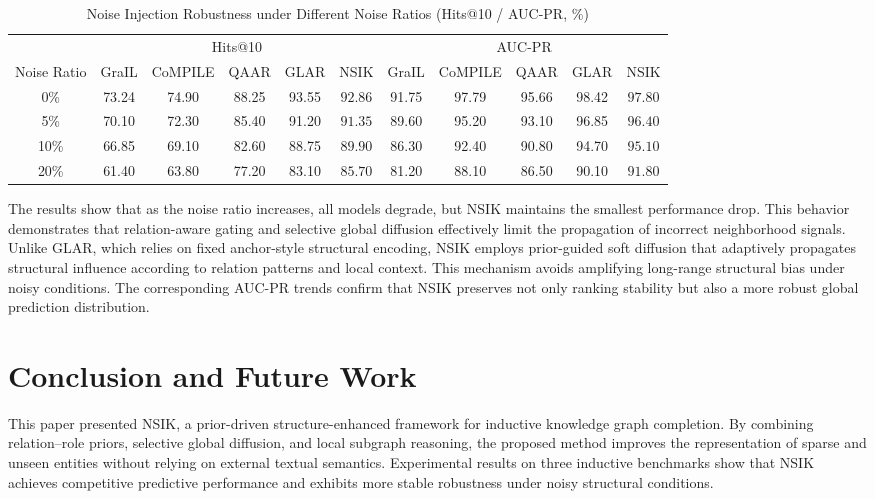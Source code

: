 \documentclass[preprint,12pt]{elsarticle}
\begin{document}
\begin{table}[H]
\centering
\small
\caption{Noise Injection Robustness under Different Noise Ratios (Hits@10 / AUC-PR, \%)}
\label{tab:noise}
\begin{tabular}{c|ccccc|ccccc}
\hline
& \multicolumn{5}{c|}{Hits@10} & \multicolumn{5}{c}{AUC-PR} \\
Noise Ratio & GraIL & CoMPILE & QAAR & GLAR & NSIK & GraIL & CoMPILE & QAAR & GLAR & NSIK \\
\hline
0\%  & 73.24 & 74.90 & 88.25 & 93.55 & $\mathbf{92.86}$ & 91.75 & 97.79 & 95.66 & 98.42 & $\mathbf{97.80}$ \\
5\%  & 70.10 & 72.30 & 85.40 & 91.20 & $\mathbf{91.35}$ & 89.60 & 95.20 & 93.10 & 96.85 & $\mathbf{96.40}$ \\
10\% & 66.85 & 69.10 & 82.60 & 88.75 & $\mathbf{89.90}$ & 86.30 & 92.40 & 90.80 & 94.70 & $\mathbf{95.10}$ \\
20\% & 61.40 & 63.80 & 77.20 & 83.10 & $\mathbf{85.70}$ & 81.20 & 88.10 & 86.50 & 90.10 & $\mathbf{91.80}$ \\
\hline
\end{tabular}
\end{table}


The results show that as the noise ratio increases, all models degrade, but NSIK maintains the smallest performance drop. This behavior demonstrates that relation-aware gating and selective global diffusion effectively limit the propagation of incorrect neighborhood signals. Unlike GLAR, which relies on fixed anchor-style structural encoding, NSIK employs prior-guided soft diffusion that adaptively propagates structural influence according to relation patterns and local context. This mechanism avoids amplifying long-range structural bias under noisy conditions. The corresponding AUC-PR trends confirm that NSIK preserves not only ranking stability but also a more robust global prediction distribution.

\section{Conclusion and Future Work}

This paper presented NSIK, a prior-driven structure-enhanced framework for inductive knowledge graph completion. By combining relation--role priors, selective global diffusion, and local subgraph reasoning, the proposed method improves the representation of sparse and unseen entities without relying on external textual semantics. Experimental results on three inductive benchmarks show that NSIK achieves competitive predictive performance and exhibits more stable robustness under noisy structural conditions.
\end{document}
